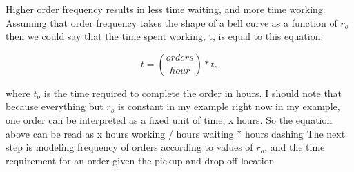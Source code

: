 \documentclass{article}
\begin{document}
Higher order frequency results in less time waiting, and more time working. Assuming that order frequency takes the shape of a bell curve as a function of  $r_o$  then we could say that the time spent working, t, is equal to this equation:

$$t = \left(\frac{orders}{hour}\right) * t_o$$

\noindent where $t_o$  is the time required to complete the order in hours. I should note that because everything but $r_o$ is constant in my example right now in my example, one order can be interpreted as a fixed unit of time, x hours. So the equation above can be read as x hours working / hours waiting * hours dashing
\newline
\newline
The next step is modeling frequency of orders according to values of $r_o$, and the time requirement for an order given the pickup and drop off location
\end{document}
